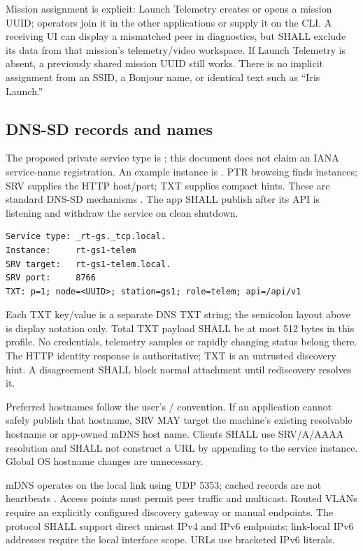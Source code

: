 Mission assignment is explicit: Launch Telemetry creates or opens a mission
UUID; operators join it in the other applications or supply it on the CLI.
A receiving UI can display a mismatched peer in diagnostics, but SHALL exclude
its data from that mission's telemetry/video workspace. If Launch Telemetry is
absent, a previously shared mission UUID still works. There is no implicit
assignment from an SSID, a Bonjour name, or identical text such as ``Iris Launch.''

\subsection{DNS-SD records and names}
The proposed private service type is ; this document
does not claim an IANA service-name registration. An example instance is
. PTR browsing finds instances;
SRV supplies the HTTP host/port; TXT supplies compact hints. These are standard
DNS-SD mechanisms \cite{dnssd}. The app SHALL publish after its API is listening
and withdraw the service on clean shutdown.

\begin{lstlisting}
Service type: _rt-gs._tcp.local.
Instance:     rt-gs1-telem
SRV target:   rt-gs1-telem.local.
SRV port:     8766
TXT: p=1; node=<UUID>; station=gs1; role=telem; api=/api/v1
\end{lstlisting}
Each TXT key/value is a separate DNS TXT string; the semicolon layout above is
display notation only. Total TXT payload SHALL be at most 512 bytes in this
profile. No credentials, telemetry samples or rapidly changing status belong
there. The HTTP identity response is authoritative; TXT is an untrusted discovery
hint. A disagreement SHALL block normal attachment until rediscovery resolves it.

Preferred hostnames follow the user's /
convention. If an application cannot safely publish that hostname, SRV MAY target
the machine's existing resolvable hostname or app-owned mDNS host name. Clients
SHALL use SRV/A/AAAA resolution and SHALL not construct a URL by appending
 to the service instance. Global OS hostname changes are unnecessary.

mDNS operates on the local link using UDP 5353; cached records are not heartbeats
\cite{mdns}. Access points must permit peer traffic and multicast. Routed VLANs
require an explicitly configured discovery gateway or manual endpoints. The
protocol SHALL support direct unicast IPv4 and IPv6 endpoints; link-local IPv6
addresses require the local interface scope. URLs use bracketed IPv6 literals.


